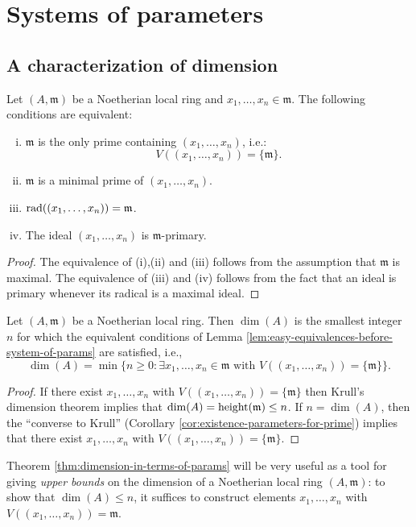 \documentclass[10pt]{article}
\begin{document}
\section{Systems of parameters}
\label{sec:orgfa54a11}
\subsection{A characterization of dimension}
\label{sec:org815b8ba}

\begin{lemma}\label{lem:easy-equivalences-before-system-of-params}
  Let $(A,\mathfrak{m})$ be a Noetherian local ring
  and $x_1,\dotsc,x_n \in \mathfrak{m}$.
  The following conditions are equivalent:
  \begin{enumerate}[(i)]
  \item $\mathfrak{m}$ is the only prime containing
    $(x_1,\dotsc,x_n)$,
    i.e.:
    \[
    V((x_1,\dotsc,x_n)) = \{\mathfrak{m}\}.
    \]
  \item $\mathfrak{m}$ is a minimal prime of $(x_1,\dotsc,x_n)$.
  \item $\operatorname{rad}((x_1,\dotsc,x_n)) = \mathfrak{m}$.
  \item The ideal $(x_1,\dotsc,x_n)$ is $\mathfrak{m}$-primary.
  \end{enumerate}
\end{lemma}
\begin{proof}
  The equivalence of (i),(ii) and (iii) follows from the
  assumption that $\mathfrak{m}$ is maximal.  The equivalence of
  (iii) and (iv) follows from the fact that
  an ideal is primary whenever its radical is a maximal ideal.
\end{proof}

\begin{theorem}\label{thm:dimension-in-terms-of-params}
  Let $(A,\mathfrak{m})$ be a Noetherian local ring.
  Then
  $\dim(A)$ is the smallest integer $n$ for which the equivalent
  conditions of
  Lemma
  \ref{lem:easy-equivalences-before-system-of-params}
  are satisfied,
  i.e.,
  \[
  \dim(A) = \min \{n \geq 0 : \exists
  x_1,\dotsc,x_n \in \mathfrak{m}
  \text{ with }
  V((x_1,\dotsc,x_n)) = \{\mathfrak{m} \}
  \}.
  \]
\end{theorem}
\begin{proof}
  If there exist
  $x_1,\dotsc,x_n$ with $V((x_1,\dotsc,x_n)) =
  \{\mathfrak{m} \}$
  then
  Krull's dimension theorem implies that
  $\dim(A) = \operatorname{height}(\mathfrak{m}) \leq n$.
  If $n = \dim(A)$,
  then
  the ``converse to Krull'' (Corollary \ref{cor:existence-parameters-for-prime})
  implies that there exist
  $x_1,\dotsc,x_n$ with $V((x_1,\dotsc,x_n)) =
  \{\mathfrak{m} \}$.
\end{proof}
Theorem \ref{thm:dimension-in-terms-of-params} will be very useful
as a tool for giving \emph{upper bounds} on the dimension
of a Noetherian local ring \((A,\mathfrak{m})\):
to show that \(\dim(A) \leq n\), it suffices
to construct elements \(x_1,\dotsc,x_n\)
with \(V((x_1,\dotsc,x_n)) = \mathfrak{m}\).
\end{document}
